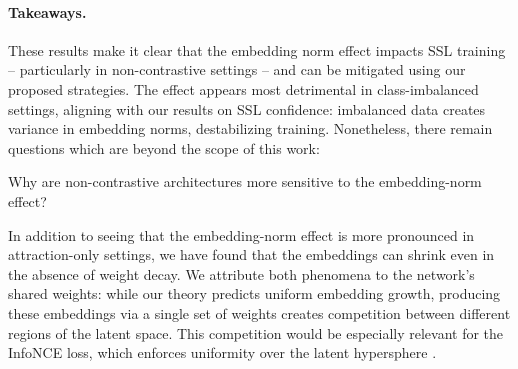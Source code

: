 \begin{table}
    \centering
    \caption{$k$-nn accuracies at epoch 500 for default, cut-initialized and GradScale training on class-imbalanced image datasets.}\vspace*{0.1cm}
    \label{tbl:imbalanced_experiments}
\end{table}

\paragraph{Takeaways.}

These results make it clear that the embedding norm effect impacts SSL training -- particularly in non-contrastive settings -- and can be mitigated using our proposed strategies. The effect appears most detrimental in class-imbalanced settings, aligning with our results on SSL confidence: imbalanced data creates variance in embedding norms, destabilizing training. Nonetheless, there remain questions which are beyond the scope of this work:
\begin{question}
    Why are non-contrastive architectures more sensitive to the embedding-norm effect?
\end{question}
In addition to seeing that the embedding-norm effect is more pronounced in attraction-only settings, we have found that the embeddings can shrink even in the absence of weight decay. We attribute both phenomena to the network's shared weights: while our theory predicts uniform embedding growth, producing these embeddings via a single set of weights creates competition between different regions of the latent space. This competition would be especially relevant for the InfoNCE loss, which enforces uniformity over the latent hypersphere \cite{understanding_contr_learn}.


